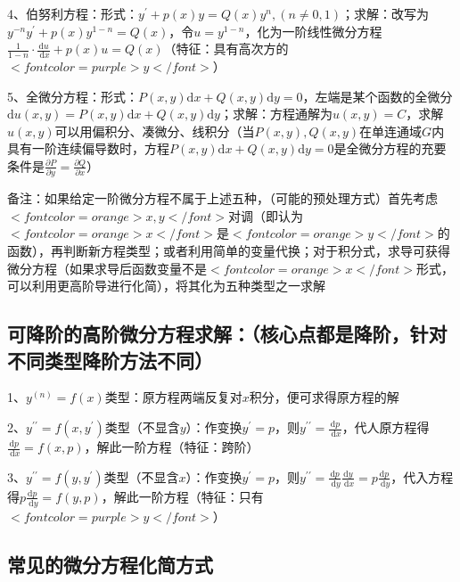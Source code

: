 4、伯努利方程：形式：$ y^{\prime}+p(x) y=Q(x) y^{n},(n \neq 0,1) $；求解：改写为$ y^{-n} y^{\prime}+p(x) y^{1-n}=Q(x) $，令$ u=y^{1-n} $，化为一阶线性微分方程$ \frac{1}{1-n} \cdot \frac{\mathrm{d} u}{\mathrm{~d} x}+p(x) u=Q(x) $（特征：具有高次方的$ <font color=purple>y</font> $）

5、全微分方程：形式：$ P(x, y) \mathrm{d} x+Q(x, y) \mathrm{d} y=0 $，左端是某个函数的全微分$ \mathrm{d} u(x, y)=P(x, y) \mathrm{d} x+Q(x, y) \mathrm{d} y $；求解：方程通解为$ u(x, y)=C $，求解$ u(x, y) $可以用偏积分、凑微分、线积分（当$ P(x, y), Q(x, y) $在单连通域$ G $内具有一阶连续偏导数时，方程$ P(x, y) \mathrm{d} x+Q(x, y) \mathrm{d} y=0 $是全微分方程的充要条件是$ \frac{\partial P}{\partial y}=\frac{\partial Q}{\partial x} $）

备注：如果给定一阶微分方程不属于上述五种，（可能的预处理方式）首先考虑$ <font color=orange>x,y</font> $对调（即认为$ <font color=orange>x</font> $是$ <font color=orange>y</font> $的函数），再判断新方程类型；或者利用简单的变量代换；对于积分式，求导可获得微分方程（如果求导后函数变量不是$ <font color=orange>x</font> $形式，可以利用更高阶导进行化简），将其化为五种类型之一求解



\subsection{可降阶的高阶微分方程求解：（核心点都是降阶，针对不同类型降阶方法不同）}

1、$ {y}^{(n)}={f}({x}) $类型：原方程两端反复对$ x $积分，便可求得原方程的解

2、$ {y}^{\prime \prime}={f}\left({x}, {y}^{\prime}\right) $类型（不显含$ {y} $）：作变换$ y^{\prime}=p $，则$ y^{\prime \prime}=\frac{\mathrm{d} p}{\mathrm{~d} x} $，代人原方程得$ \frac{\mathrm{d} p}{\mathrm{~d} x}=f(x, p) $，解此一阶方程（特征：跨阶）

3、$ {y}^{\prime \prime}={f}\left({y}, {y}^{\prime}\right) $类型（不显含$ x $）：作变换$ y^{\prime}=p $，则$ y^{\prime \prime}=\frac{\mathrm{d} p}{\mathrm{~d} y} \frac{\mathrm{d} y}{\mathrm{~d} x}=p \frac{\mathrm{d} p}{\mathrm{~d} y} $，代入方程得$ p \frac{\mathrm{d} p}{\mathrm{~d} y}=f(y, p) $，解此一阶方程（特征：只有$ <font color=purple>y</font> $）



\subsection{常见的微分方程化简方式}

